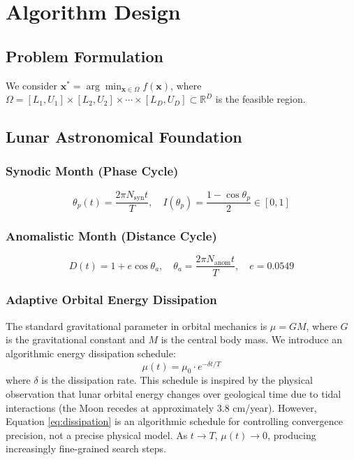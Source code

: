 \documentclass[review]{elsarticle}
\theoremstyle{definition}
\begin{document}
\section{Algorithm Design}
\label{sec:design}

\subsection{Problem Formulation}

We consider $\mathbf{x}^* = \arg\min_{\mathbf{x} \in \Omega} f(\mathbf{x})$, where $\Omega = [L_1, U_1] \times [L_2, U_2] \times \cdots \times [L_D, U_D] \subset \mathbb{R}^D$ is the feasible region.

\subsection{Lunar Astronomical Foundation}

\subsubsection{Synodic Month (Phase Cycle)}
\begin{equation}
\theta_p(t) = \frac{2\pi N_{\mathrm{syn}} t}{T}, \quad I(\theta_p) = \frac{1 - \cos\theta_p}{2} \in [0,1]
\label{eq:illum}
\end{equation}

\subsubsection{Anomalistic Month (Distance Cycle)}
\begin{equation}
D(t) = 1 + e\cos\theta_a, \quad \theta_a = \frac{2\pi N_{\mathrm{anom}} t}{T}, \quad e = 0.0549
\label{eq:dist}
\end{equation}

\subsubsection{Adaptive Orbital Energy Dissipation}

The standard gravitational parameter in orbital mechanics is $\mu = GM$, where $G$ is the gravitational constant and $M$ is the central body mass. We introduce an algorithmic energy dissipation schedule:
\begin{equation}
\mu(t) = \mu_0 \cdot e^{-\delta t/T}
\label{eq:dissipation}
\end{equation}
where $\delta$ is the dissipation rate. This schedule is inspired by the physical observation that lunar orbital energy changes over geological time due to tidal interactions (the Moon recedes at approximately 3.8 cm/year). However, Equation \eqref{eq:dissipation} is an algorithmic schedule for controlling convergence precision, not a precise physical model. As $t \to T$, $\mu(t) \to 0$, producing increasingly fine-grained search steps.
\end{document}
